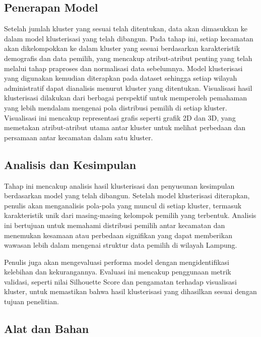 \subsection{Penerapan Model}
Setelah jumlah kluster yang sesuai telah ditentukan, data akan dimasukkan ke dalam model klusterisasi yang telah dibangun. Pada tahap ini, setiap kecamatan akan dikelompokkan ke dalam kluster yang sesuai berdasarkan karakteristik demografis dan data pemilih, yang mencakup atribut-atribut penting yang telah melalui tahap praproses dan normalisasi data sebelumnya. Model klusterisasi yang digunakan kemudian diterapkan pada dataset sehingga setiap wilayah administratif dapat dianalisis menurut kluster yang ditentukan.
Visualisasi hasil klusterisasi dilakukan dari berbagai perspektif untuk memperoleh pemahaman yang lebih mendalam mengenai pola distribusi pemilih di setiap kluster. Visualisasi ini mencakup representasi grafis seperti grafik 2D dan 3D, yang memetakan atribut-atribut utama antar kluster untuk melihat perbedaan dan persamaan antar kecamatan dalam satu kluster.

\subsection{Analisis dan Kesimpulan}
Tahap ini mencakup analisis hasil klusterisasi dan penyusunan kesimpulan berdasarkan model yang telah dibangun. Setelah model klusterisasi diterapkan, penulis akan menganalisis pola-pola yang muncul di setiap kluster, termasuk karakteristik unik dari masing-masing kelompok pemilih yang terbentuk. Analisis ini bertujuan untuk memahami distribusi pemilih antar kecamatan dan menemukan kesamaan atau perbedaan signifikan yang dapat memberikan wawasan lebih dalam mengenai struktur data pemilih di wilayah Lampung.

Penulis juga akan mengevaluasi performa model dengan mengidentifikasi kelebihan dan kekurangannya. Evaluasi ini mencakup penggunaan metrik validasi, seperti nilai Silhouette Score dan pengamatan terhadap visualisasi kluster, untuk memastikan bahwa hasil klusterisasi yang dihasilkan sesuai dengan tujuan penelitian.

\subsection{Alat dan Bahan}
